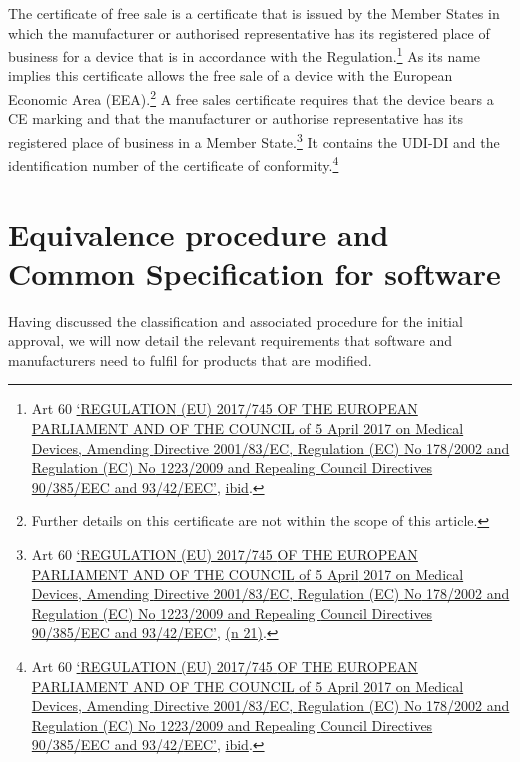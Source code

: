 \documentclass[
]{scrartcl}
\begin{document}
The certificate of free sale is a certificate that is issued by the Member States in which the manufacturer or authorised representative has its registered place of business for a device that is in accordance with the Regulation.\footnote{Art 60 \protect\hyperlink{ref-REGULATIONEU2017a}{{`{REGULATION} ({EU}) 2017/745 {OF THE EUROPEAN PARLIAMENT AND OF THE COUNCIL} of 5 {April} 2017 on Medical Devices, Amending {Directive} 2001/83/{EC}, {Regulation} ({EC}) {No} 178/2002 and {Regulation} ({EC}) {No} 1223/2009 and Repealing {Council Directives} 90/385/{EEC} and 93/42/{EEC}'}}, \protect\hyperlink{ref-REGULATIONEU2017a}{ibid}.} As its name implies this certificate allows the free sale of a device with the European Economic Area (EEA).\footnote{Further details on this certificate are not within the scope of this article.} A free sales certificate requires that the device bears a CE marking and that the manufacturer or authorise representative has its registered place of business in a Member State.\footnote{Art 60 \protect\hyperlink{ref-REGULATIONEU2017a}{{`{REGULATION} ({EU}) 2017/745 {OF THE EUROPEAN PARLIAMENT AND OF THE COUNCIL} of 5 {April} 2017 on Medical Devices, Amending {Directive} 2001/83/{EC}, {Regulation} ({EC}) {No} 178/2002 and {Regulation} ({EC}) {No} 1223/2009 and Repealing {Council Directives} 90/385/{EEC} and 93/42/{EEC}'}}, \protect\hyperlink{ref-REGULATIONEU2017a}{(n 21)}.} It contains the UDI-DI and the identification number of the certificate of conformity.\footnote{Art 60 \protect\hyperlink{ref-REGULATIONEU2017a}{{`{REGULATION} ({EU}) 2017/745 {OF THE EUROPEAN PARLIAMENT AND OF THE COUNCIL} of 5 {April} 2017 on Medical Devices, Amending {Directive} 2001/83/{EC}, {Regulation} ({EC}) {No} 178/2002 and {Regulation} ({EC}) {No} 1223/2009 and Repealing {Council Directives} 90/385/{EEC} and 93/42/{EEC}'}}, \protect\hyperlink{ref-REGULATIONEU2017a}{ibid}.}

\hypertarget{equivalence-procedure-and-common-specification-for-software}{%
\section{Equivalence procedure and Common Specification for software}\label{equivalence-procedure-and-common-specification-for-software}}

Having discussed the classification and associated procedure for the initial approval, we will now detail the relevant requirements that software and manufacturers need to fulfil for products that are modified.
\end{document}
